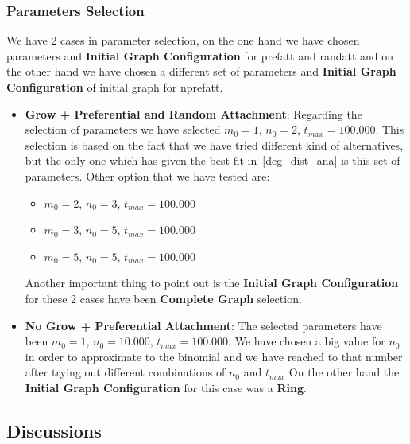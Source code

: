 \documentclass[12pt, a4paper]{article}
\begin{document}
\subsubsection{Parameters Selection}
We have 2 cases in parameter selection, on the one hand we have chosen parameters and \textbf{Initial Graph Configuration} for \acrshort{prefatt} and \acrfull{randatt} and on the other hand we have chosen a different set of parameters
and \textbf{Initial Graph Configuration} of initial graph for \acrshort{nprefatt}.

\begin{itemize}
    \item \textbf{Grow + Preferential and Random Attachment}: Regarding the selection of parameters we have selected $m_0 = 1$, $n_0 = 2$, $t_{max} = 100.000$.
    This selection is based on the fact that we have tried different kind of alternatives, but the only one which has given the best fit 
    in~\ref{deg_dist_ana} is this set of parameters.
    Other option that we have tested are:
    
    \begin{itemize}
        \item $m_0 = 2$, $n_0 = 3$, $t_{max} = 100.000$
        \item $m_0 = 3$, $n_0 = 5$, $t_{max} = 100.000$
        \item $m_0 = 5$, $n_0 = 5$, $t_{max} = 100.000$
    \end{itemize}

    Another important thing to point out is the \textbf{Initial Graph Configuration} for these 2 cases have been \textbf{Complete Graph} selection.
    
    \item \textbf{No Grow + Preferential Attachment}: The selected parameters have been $m_0 = 1$, $n_0= 10.000$, $t_{max} = 100.000$. 
    We have chosen a big value for $n_0$ in order to approximate to the binomial and we have reached to that number after trying out different combinations of $n_0$ and $t_{max}$
    On the other hand the \textbf{Initial Graph Configuration} for this case was a \textbf{Ring}.
    
\end{itemize}


\subsection{Discussions}\label{sec:disc}
\end{document}
